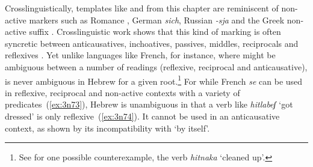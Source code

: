 \begin{exe}
\begin{xlist}
\begin{xlist}
\begin{exe}
\begin{xlist}
\begin{xlist}
\begin{exe}
\begin{xlist}
\begin{xlist}
\begin{exe}
\begin{exe}
\begin{xlist}
\begin{exe}
\begin{exe}
\begin{xlist}
\begin{exe}
\begin{exe}
\begin{exe}
\begin{exe}
\begin{exe}
\begin{xlist}
\begin{exe}
\begin{xlist}
\begin{exe}
\begin{exe}
\begin{xlist}
\begin{exe}
\begin{xlist}
\begin{exe}
\begin{exe}
\begin{exe}
\begin{xlist}
\begin{exe}
\begin{exe}
\begin{exe}
\begin{xlist}
\begin{exe}
\begin{xlist}
\begin{exe}
\begin{xlist}
\begin{exe}
\begin{xlist}
\begin{exe}
\begin{exe}
\begin{exe}
\begin{exe}
\begin{xlist}
\begin{exe}
\begin{xlist}
\begin{exe}
\begin{xlist}
\begin{exe}
\begin{xlist}
\begin{exe}
\begin{xlist}
\begin{exe}
\begin{xlist}
\begin{exe}
\begin{exe}
\begin{exe}
\begin{exe}
\begin{xlist}
\begin{exe}
\begin{xlist}
\begin{exe}
\begin{xlist}
\begin{exe}
\begin{exe}
\begin{xlist}
\begin{exe}
\begin{exe}
\begin{exe}
\begin{exe}
\begin{xlist}
\begin{xlist}
\begin{exe}
\begin{xlist}
\begin{exe}
\begin{exe}
\begin{exe}
\begin{xlist}
\begin{exe}
\begin{exe}
\begin{xlist}
\begin{exe}
\begin{exe}
\begin{exe}
\begin{xlist}
\begin{xlist}
\begin{exe}
\begin{xlist}
Crosslinguistically, templates like {\tnif} and {\thit} from this chapter are reminiscent of non-active markers such as Romance , German \emph{sich}, Russian \emph{-sja} and the Greek non-active suffix . Crosslinguistic work shows that this kind of marking is often syncretic between anticausatives, inchoatives, passives, middles, reciprocals and reflexives \citep{geniusiene87,klaiman91,alexiadoudoron12,kastnerzu17}. Yet unlike languages like French, for instance, where  might be ambiguous between a number of readings (reflexive, reciprocal and anticausative), {\thit} is never ambiguous in Hebrew for a given root.\footnote{See \cite{kastner17gjgl} for one possible counterexample, the verb \emph{hitnaka} `cleaned up'.} For while French \emph{se} can be used in reflexive, reciprocal and non-active contexts with a variety of predicates~(\ref{ex:3n73}), Hebrew {\thit} is unambiguous in that a verb like \emph{hitlabeʃ} `got dressed' is only reflexive~(\ref{ex:3n74}). It cannot be used in an anticausative context, as shown by its incompatibility with `by itself'.
 \begin{exe}
 \ex \label{ex:3n73}

\end{exe}
\end{xlist}
\end{exe}
\end{xlist}
\end{xlist}
\end{exe}
\end{exe}
\end{exe}
\end{xlist}
\end{exe}
\end{exe}
\end{xlist}
\end{exe}
\end{exe}
\end{exe}
\end{xlist}
\end{exe}
\end{xlist}
\end{xlist}
\end{exe}
\end{exe}
\end{exe}
\end{exe}
\end{xlist}
\end{exe}
\end{exe}
\end{xlist}
\end{exe}
\end{xlist}
\end{exe}
\end{xlist}
\end{exe}
\end{exe}
\end{exe}
\end{exe}
\end{xlist}
\end{exe}
\end{xlist}
\end{exe}
\end{xlist}
\end{exe}
\end{xlist}
\end{exe}
\end{xlist}
\end{exe}
\end{xlist}
\end{exe}
\end{exe}
\end{exe}
\end{exe}
\end{xlist}
\end{exe}
\end{xlist}
\end{exe}
\end{xlist}
\end{exe}
\end{xlist}
\end{exe}
\end{exe}
\end{exe}
\end{xlist}
\end{exe}
\end{exe}
\end{exe}
\end{xlist}
\end{exe}
\end{xlist}
\end{exe}
\end{exe}
\end{xlist}
\end{exe}
\end{xlist}
\end{exe}
\end{exe}
\end{exe}
\end{exe}
\end{exe}
\end{xlist}
\end{exe}
\end{exe}
\end{xlist}
\end{exe}
\end{exe}
\end{xlist}
\end{xlist}
\end{exe}
\end{xlist}
\end{xlist}
\end{exe}
\end{xlist}
\end{xlist}
\end{exe}
